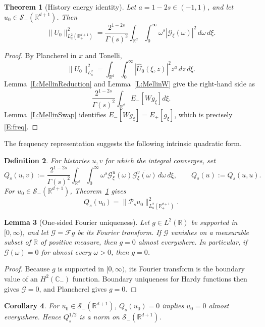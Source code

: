 \documentclass[11pt,letter]{amsart}
\def \RNu {\mathbb{R}^{d+1}}
\def \RN {\mathbb{R}_+^{d+1}}
\def \G{\Gamma}
\newcommand{\Rd}{\mathbb R^d}
\numberwithin{equation}{section}
\newcommand{\Sm}{\mathscr S_-(\RNu)}
\newtheorem{theorem}{Theorem}[section]
\newtheorem{lemma}[theorem]{Lemma}
\newtheorem{corollary}[theorem]{Corollary}
\newtheorem{definition}[theorem]{Definition}
\numberwithin{equation}{section}
\begin{document}
\begin{theorem}[History energy identity]\label{T:history}
Let $a=1-2s\in(-1,1)$, and let $u_0\in\Sm$. Then
\begin{equation}\label{E:freq}
\|U_0\|_{L_a^2(\RN)}^2
=
\frac{2^{1-2s}}{\G(s)^2}
\int_{\Rd}\int_0^\infty
\omega^s|\mathscr G_\xi(\omega)|^2\,d\omega\,d\xi.
\end{equation}
\end{theorem}

\begin{proof}
By Plancherel in $x$ and Tonelli,
\[
\|U_0\|_{L_a^2}^2
=\int_{\Rd}\int_0^\infty|\widehat U_0(\xi,z)|^2z^a\,dz\,d\xi.
\]
Lemma~\ref{L:MellinReduction} and Lemma~\ref{L:MellinW} give the right-hand
side as
\[
\frac{2^{1-2s}}{\G(s)^2}\int_{\Rd}E_-[Wg_\xi]d\xi.
\]
Lemma~\ref{L:MellinSwap} identifies $E_-[Wg_\xi]=E_+[g_\xi]$, which is precisely
\eqref{E:freq}.
\end{proof}

The frequency representation suggests the following intrinsic quadratic form.

\begin{definition}\label{D:Qs}
For histories $u,v$ for which the integral converges, set
\[
Q_s(u,v):=
\frac{2^{1-2s}}{\G(s)^2}
\int_{\Rd}\int_0^\infty
\omega^s\mathscr G^u_\xi(\omega)\overline{\mathscr G^v_\xi(\omega)}\,d\omega\,d\xi,
\qquad Q_s(u):=Q_s(u,u).
\]
For $u_0\in\Sm$, Theorem~\ref{T:history} gives
\[
Q_s(u_0)=\|\mathcal P_su_0\|_{L_a^2(\RN)}^2.
\]
\end{definition}

\begin{lemma}[One-sided Fourier uniqueness]\label{L:onesided-Fourier}
Let $g\in L^2(\mathbb R)$ be supported in $[0,\infty)$, and let
$\mathscr G=\mathscr Fg$ be its Fourier transform. If $\mathscr G$ vanishes on a
measurable subset of $\mathbb R$ of positive measure, then $g=0$ almost everywhere.
In particular, if $\mathscr G(\omega)=0$ for almost every $\omega>0$, then $g=0$.
\end{lemma}

\begin{proof}
Because $g$ is supported in $[0,\infty)$, its Fourier transform is the boundary
value of an $H^2(\mathbb C_-)$ function. Boundary uniqueness for Hardy functions
then gives $\mathscr G=0$, and Plancherel gives $g=0$.
\end{proof}

\begin{corollary}\label{C:positive}
For $u_0\in\Sm$, $Q_s(u_0)=0$ implies $u_0=0$ almost everywhere. Hence
$Q_s^{1/2}$ is a norm on $\Sm$.
\end{corollary}
\end{document}
